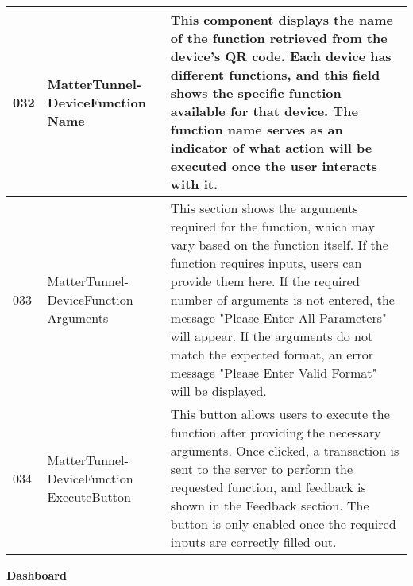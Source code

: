 \documentclass[conference]{IEEEtran}
\begin{document}
\begin{enumerate}[itemsep=2ex, parsep=1ex]
\begin{enumerate}[itemsep=2ex, parsep=1ex]
	      	      \begin{table}[h!]
	      	      	\def\arraystretch{1.24} \small
	      	      	\begin{tabular}{|p{1.2cm}|p{2.5cm}|p{4.0cm}|}
	      	      		\hline
	      	      		032 & MatterTunnel-DeviceFunction Name          & This component displays the name of the function retrieved from the device’s QR code. Each device has different functions, and this field shows the specific function available for that device. The function name serves as an indicator of what action will be executed once the user interacts with it.                                                                                         \\
	      	      		\hline
	      	      		033 & MatterTunnel-DeviceFunction Arguments     & This section shows the arguments required for the function, which may vary based on the function itself. If the function requires inputs, users can provide them here. If the required number of arguments is not entered, the message "Please Enter All Parameters" will appear. If the arguments do not match the expected format, an error message "Please Enter Valid Format" will be displayed. \\
	      	      		\hline
	      	      		034 & MatterTunnel-DeviceFunction ExecuteButton & This button allows users to execute the function after providing the necessary arguments. Once clicked, a transaction is sent to the server to perform the requested function, and feedback is shown in the Feedback section. The button is only enabled once the required inputs are correctly filled out.                                                                                          \\
	      	      		\hline
	      	      	\end{tabular}
	      	      \end{table}
	      \end{enumerate}
\end{enumerate}

{\centering \textbf{Dashboard} \par}
\end{document}
